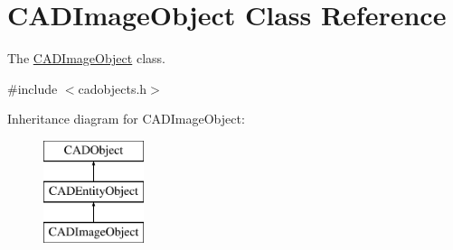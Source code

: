 \hypertarget{class_c_a_d_image_object}{}\section{C\+A\+D\+Image\+Object Class Reference}
\label{class_c_a_d_image_object}


The \hyperlink{class_c_a_d_image_object}{C\+A\+D\+Image\+Object} class.  




{\ttfamily \#include $<$cadobjects.\+h$>$}

Inheritance diagram for C\+A\+D\+Image\+Object\+:\begin{figure}[H]
\begin{center}
\leavevmode
\includegraphics[height=3.000000cm]{class_c_a_d_image_object}
\end{center}
\end{figure}
